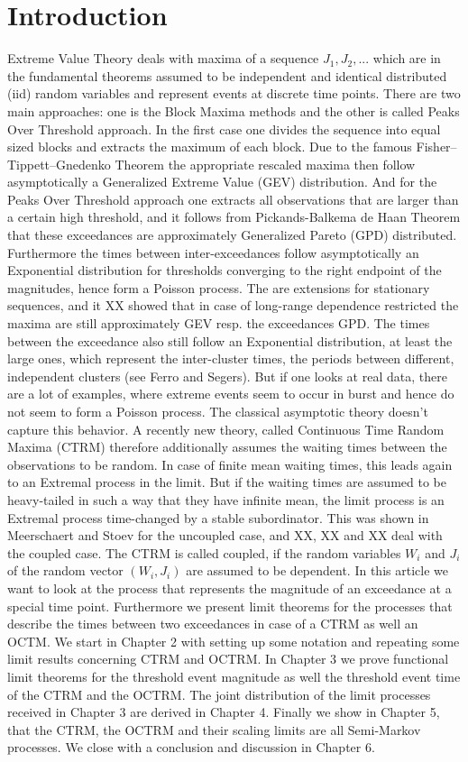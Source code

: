\documentclass[12pt, a4paper]{article}
\newcommand{\1}{\mathbf 1}
\begin{document}
\section{Introduction}
Extreme Value Theory deals with maxima of a sequence $J_1,J_2,...$ which are in the fundamental theorems assumed to be independent and identical distributed (iid) random variables and represent events at discrete time points. There are two main approaches: one is the Block Maxima methods and the other is called Peaks Over Threshold approach. In the first case one divides the sequence into equal sized blocks and extracts the maximum of each block. Due to the famous Fisher–Tippett–Gnedenko Theorem the appropriate rescaled maxima then follow asymptotically a Generalized Extreme Value (GEV) distribution. And for the Peaks Over Threshold approach one extracts all observations that are larger than a certain high threshold, and it follows from Pickands-Balkema de Haan Theorem that these exceedances are approximately Generalized Pareto (GPD) distributed. Furthermore the times between inter-exceedances follow asymptotically an Exponential distribution for thresholds converging to the right endpoint of the magnitudes, hence form a Poisson process. The are extensions for stationary sequences, and it XX showed that in case of long-range dependence restricted the maxima are still approximately GEV resp. the exceedances GPD. The times between the exceedance also still follow an Exponential distribution, at least the large ones, which represent the inter-cluster times, the periods between different, independent clusters (see Ferro and Segers). But if one looks at real data, there are a lot of examples, where extreme events seem to occur in burst and hence do not seem to form a Poisson process. The classical asymptotic theory doesn't capture this behavior. A recently new theory, called Continuous Time Random Maxima (CTRM) therefore additionally assumes the waiting times between the observations to be random. In case of finite mean waiting times, this leads again to an Extremal process in the limit. But if the waiting times are assumed to be heavy-tailed in such a way that they have infinite mean, the limit process is an Extremal process time-changed by a stable subordinator. This was shown in Meerschaert and Stoev for the uncoupled case, and XX, XX and XX deal with the coupled case. The CTRM is called coupled, if the random variables $W_i$ and $J_i$ of the random vector $(W_i,J_i)$ are assumed to be dependent.
In this article we want to look at the process that represents the magnitude of an exceedance at a special time point. Furthermore we present limit theorems for the processes that describe the times between two exceedances in case of a CTRM as well an OCTM. We start in Chapter 2 with setting up some notation and repeating some limit results concerning CTRM and OCTRM. In Chapter 3 we prove functional limit theorems for the threshold event magnitude as well the threshold event time of the CTRM and the OCTRM. The joint distribution of the limit processes received in Chapter 3 are derived in Chapter 4. Finally we show in Chapter 5, that the CTRM, the OCTRM and their scaling limits are all Semi-Markov processes. We close with a conclusion and discussion in Chapter 6.\\
\end{document}
